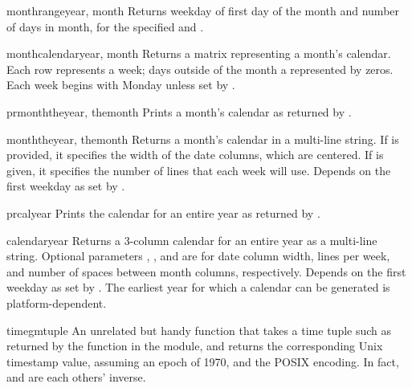 \begin{funcdesc}{monthrange}{year, month}
Returns weekday of first day of the month and number of days in month, 
for the specified  and .
\end{funcdesc}

\begin{funcdesc}{monthcalendar}{year, month}
Returns a matrix representing a month's calendar.  Each row represents
a week; days outside of the month a represented by zeros.
Each week begins with Monday unless set by .
\end{funcdesc}

\begin{funcdesc}{prmonth}{theyear, themonth}
Prints a month's calendar as returned by .
\end{funcdesc}

\begin{funcdesc}{month}{theyear, themonth}
Returns a month's calendar in a multi-line string. If  is
provided, it specifies the width of the date columns, which are
centered. If  is given, it specifies the number of lines that
each week will use. Depends on the first weekday as set by
.
\end{funcdesc}

\begin{funcdesc}{prcal}{year}
Prints the calendar for an entire year as returned by 
.
\end{funcdesc}

\begin{funcdesc}{calendar}{year}
Returns a 3-column calendar for an entire year as a multi-line string.
Optional parameters , , and  are for date column
width, lines per week, and number of spaces between month columns,
respectively. Depends on the first weekday as set by
.  The earliest year for which a calendar can
be generated is platform-dependent.
\end{funcdesc}

\begin{funcdesc}{timegm}{tuple}
An unrelated but handy function that takes a time tuple such as
returned by the  function in the 
module, and returns the corresponding Unix timestamp value, assuming
an epoch of 1970, and the POSIX encoding.  In fact,
 and  are each others' inverse.
\end{funcdesc}


\begin{seealso}
\end{seealso}
